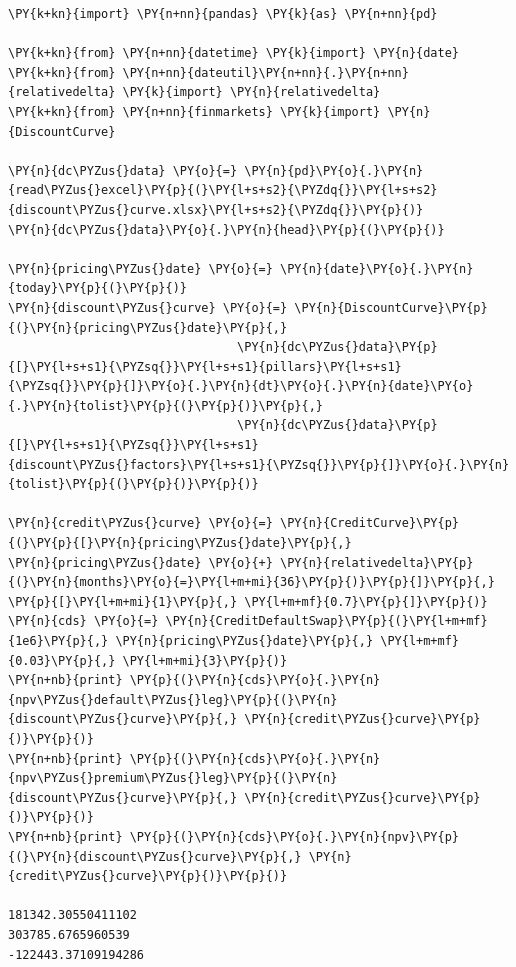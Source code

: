 \begin{tcolorbox}[breakable, size=fbox, boxrule=1pt, pad at break*=1mm,colback=cellbackground, colframe=cellborder]
\begin{Verbatim}[commandchars=\\\{\}]
\PY{k+kn}{import} \PY{n+nn}{pandas} \PY{k}{as} \PY{n+nn}{pd}
	
\PY{k+kn}{from} \PY{n+nn}{datetime} \PY{k}{import} \PY{n}{date}
\PY{k+kn}{from} \PY{n+nn}{dateutil}\PY{n+nn}{.}\PY{n+nn}{relativedelta} \PY{k}{import} \PY{n}{relativedelta}
\PY{k+kn}{from} \PY{n+nn}{finmarkets} \PY{k}{import} \PY{n}{DiscountCurve}
	
\PY{n}{dc\PYZus{}data} \PY{o}{=} \PY{n}{pd}\PY{o}{.}\PY{n}{read\PYZus{}excel}\PY{p}{(}\PY{l+s+s2}{\PYZdq{}}\PY{l+s+s2}{discount\PYZus{}curve.xlsx}\PY{l+s+s2}{\PYZdq{}}\PY{p}{)}
\PY{n}{dc\PYZus{}data}\PY{o}{.}\PY{n}{head}\PY{p}{(}\PY{p}{)}
	
\PY{n}{pricing\PYZus{}date} \PY{o}{=} \PY{n}{date}\PY{o}{.}\PY{n}{today}\PY{p}{(}\PY{p}{)}
\PY{n}{discount\PYZus{}curve} \PY{o}{=} \PY{n}{DiscountCurve}\PY{p}{(}\PY{n}{pricing\PYZus{}date}\PY{p}{,} 
                                \PY{n}{dc\PYZus{}data}\PY{p}{[}\PY{l+s+s1}{\PYZsq{}}\PY{l+s+s1}{pillars}\PY{l+s+s1}{\PYZsq{}}\PY{p}{]}\PY{o}{.}\PY{n}{dt}\PY{o}{.}\PY{n}{date}\PY{o}{.}\PY{n}{tolist}\PY{p}{(}\PY{p}{)}\PY{p}{,}
                                \PY{n}{dc\PYZus{}data}\PY{p}{[}\PY{l+s+s1}{\PYZsq{}}\PY{l+s+s1}{discount\PYZus{}factors}\PY{l+s+s1}{\PYZsq{}}\PY{p}{]}\PY{o}{.}\PY{n}{tolist}\PY{p}{(}\PY{p}{)}\PY{p}{)}
	
\PY{n}{credit\PYZus{}curve} \PY{o}{=} \PY{n}{CreditCurve}\PY{p}{(}\PY{p}{[}\PY{n}{pricing\PYZus{}date}\PY{p}{,} 
\PY{n}{pricing\PYZus{}date} \PY{o}{+} \PY{n}{relativedelta}\PY{p}{(}\PY{n}{months}\PY{o}{=}\PY{l+m+mi}{36}\PY{p}{)}\PY{p}{]}\PY{p}{,} \PY{p}{[}\PY{l+m+mi}{1}\PY{p}{,} \PY{l+m+mf}{0.7}\PY{p}{]}\PY{p}{)}
\PY{n}{cds} \PY{o}{=} \PY{n}{CreditDefaultSwap}\PY{p}{(}\PY{l+m+mf}{1e6}\PY{p}{,} \PY{n}{pricing\PYZus{}date}\PY{p}{,} \PY{l+m+mf}{0.03}\PY{p}{,} \PY{l+m+mi}{3}\PY{p}{)}
\PY{n+nb}{print} \PY{p}{(}\PY{n}{cds}\PY{o}{.}\PY{n}{npv\PYZus{}default\PYZus{}leg}\PY{p}{(}\PY{n}{discount\PYZus{}curve}\PY{p}{,} \PY{n}{credit\PYZus{}curve}\PY{p}{)}\PY{p}{)}
\PY{n+nb}{print} \PY{p}{(}\PY{n}{cds}\PY{o}{.}\PY{n}{npv\PYZus{}premium\PYZus{}leg}\PY{p}{(}\PY{n}{discount\PYZus{}curve}\PY{p}{,} \PY{n}{credit\PYZus{}curve}\PY{p}{)}\PY{p}{)}
\PY{n+nb}{print} \PY{p}{(}\PY{n}{cds}\PY{o}{.}\PY{n}{npv}\PY{p}{(}\PY{n}{discount\PYZus{}curve}\PY{p}{,} \PY{n}{credit\PYZus{}curve}\PY{p}{)}\PY{p}{)}

181342.30550411102
303785.6765960539
-122443.37109194286
\end{Verbatim}
\end{tcolorbox}

